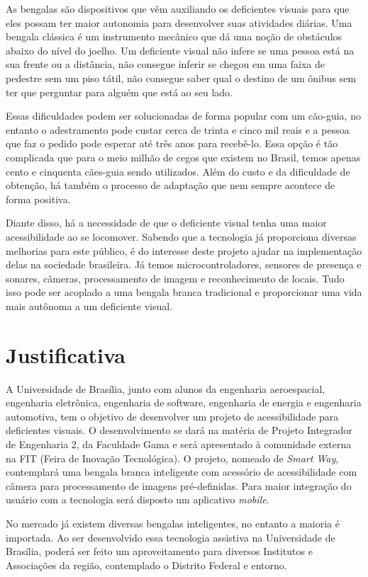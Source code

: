 As bengalas são dispositivos que vêm auxiliando os deficientes visuais para que eles possam ter maior autonomia para desenvolver suas atividades diárias. Uma bengala clássica é um instrumento mecânico que dá uma noção de obstáculos abaixo do nível do joelho. Um deficiente visual não infere se uma pessoa está na sua frente ou a distância, não consegue inferir se chegou em uma faixa de pedestre sem um piso tátil, não consegue saber qual o destino de um ônibus sem ter que perguntar para alguém que está ao seu lado. 

Essas dificuldades podem ser solucionadas de forma popular com um cão-guia, no entanto o adestramento pode custar cerca de trinta e cinco mil reais e a pessoa que faz o pedido pode esperar até três anos para recebê-lo. Essa opção é tão complicada que para o meio milhão de cegos que existem no Brasil, temos apenas cento e cinquenta cães-guia sendo utilizados. Além do custo e da dificuldade de obtenção, há também o processo de adaptação que nem sempre acontece de forma positiva.
	
Diante disso, há a necessidade de que o deficiente visual tenha uma maior acessibilidade ao se locomover. Sabendo que a tecnologia já proporciona diversas melhorias para este público, é do interesse deste projeto ajudar na implementação delas na sociedade brasileira. Já temos microcontroladores, sensores de presença e sonares, câmeras, processamento de imagem e reconhecimento de locais. Tudo isso pode ser acoplado a uma bengala branca tradicional e proporcionar uma vida mais autônoma a um deficiente visual.

\section{Justificativa}

A Universidade de Brasília, junto com alunos da engenharia aeroespacial, engenharia eletrônica, engenharia de software, engenharia de energia e engenharia automotiva, tem o objetivo de desenvolver um projeto de acessibilidade para deficientes visuais. O desenvolvimento se dará na matéria de Projeto Integrador de Engenharia 2, da Faculdade Gama e será apresentado à comunidade externa na FIT (Feira de Inovação Tecnológica). O projeto, nomeado de  \textit{Smart Way}, contemplará uma bengala branca inteligente com acessório de acessibilidade com câmera para processamento de imagens pré-definidas. Para maior integração do usuário com a tecnologia será disposto um aplicativo \textit{mobile}.

No mercado já existem diversas bengalas inteligentes, no entanto a maioria é importada. Ao ser desenvolvido essa tecnologia assistiva na Universidade de Brasília, poderá ser feito um aproveitamento para diversos Institutos e Associações da região, contemplado o Distrito Federal e entorno. 
	

